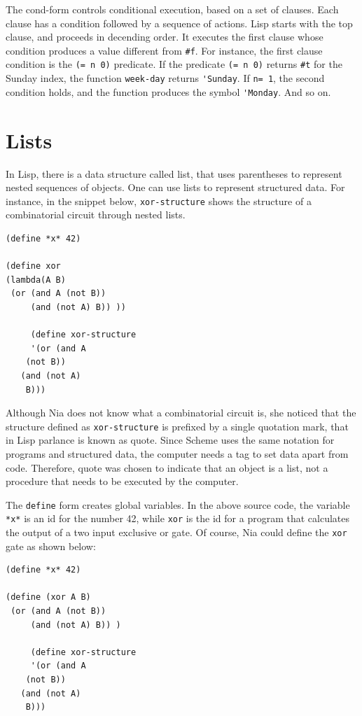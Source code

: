 \documentclass[a4paper,12pt]{book}
\begin{document}
The cond-form controls conditional
execution, based on a set of clauses.
Each clause has a condition followed by
a sequence of actions.  Lisp starts with the
top clause, and proceeds in decending order.
It executes the first clause whose 
condition produces a value different from \verb|#f|.
For instance, the first clause condition is
the \verb|(= n 0)| predicate.
If the predicate \verb|(= n 0)| 
returns \verb|#t| for the Sunday index,
the function \verb|week-day| returns \verb|'Sunday|.
If \verb|n= 1|, the second condition holds,
and the function produces the symbol \verb|'Monday|.
And so on.


\section{Lists}
In Lisp, there is a data structure called list,
that uses parentheses to represent nested
sequences of objects. One can use lists to
represent structured data.
For instance, in the snippet below,
\verb|xor-structure| shows
the structure of a combinatorial circuit
through nested lists.

\begin{verbatim}
(define *x* 42)

(define xor
(lambda(A B)
 (or (and A (not B))
     (and (not A) B)) ))

     (define xor-structure
     '(or (and A  
	(not B))
   (and (not A) 
	B)))
\end{verbatim}

Although Nia does not know what a combinatorial 
circuit is, she noticed that the structure
defined as \verb|xor-structure| is prefixed by a
single quotation mark, that in Lisp parlance is
known as quote. Since Scheme uses the
same notation for programs and structured
data, the computer needs a tag to set
data apart from code. Therefore, 
quote was chosen to indicate that
an object is a list, not a procedure that
needs to be executed by the computer.

The \verb|define| form creates global
variables. In the above source code,
the variable \verb|*x*| is an id for the
number 42,
while \verb|xor| is the id for a program
that calculates the output of a two
input exclusive or gate. Of course, Nia
could define the \verb|xor| gate as shown below:
\begin{verbatim}
(define *x* 42)

(define (xor A B)
 (or (and A (not B))
     (and (not A) B)) )

     (define xor-structure
     '(or (and A 
	(not B))
   (and (not A) 
	B)))
\end{verbatim}
\end{document}
